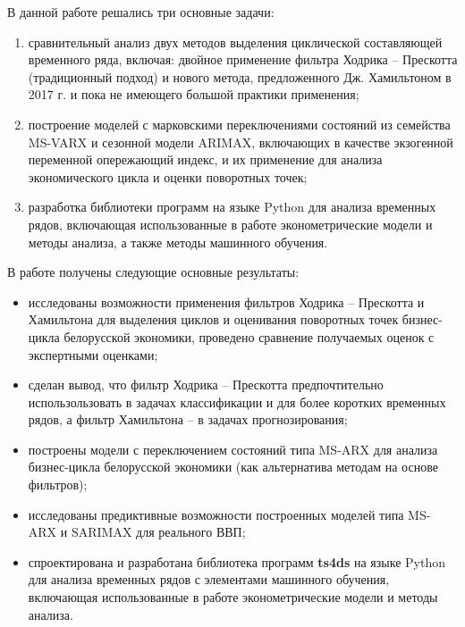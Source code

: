 \documentclass[a4paper,14pt]{extreport}
\begin{document}
{		В данной работе решались три основные задачи:
		\begin{enumerate}
			\item сравнительный анализ двух методов выделения циклической составляющей временного ряда, включая: двойное применение фильтра Ходрика -- Прескотта (традиционный подход) и нового метода, предложенного Дж. Хамильтоном в 2017 г. и пока не имеющего большой практики применения;
			
			\item построение моделей с марковскими переключениями состояний из семейства MS-VARX и сезонной модели ARIMAX, включающих в качестве экзогенной переменной опережающий индекс, и их применение для анализа экономического цикла и оценки поворотных точек;
			
			\item разработка библиотеки программ на языке Python для анализа временных рядов, включающая использованные в работе эконометрические модели и методы анализа, а также методы машинного обучения.
		\end{enumerate}
		\fi
		
		В работе получены следующие основные результаты:
		
		\begin{itemize}
			\item исследованы возможности применения фильтров Ходрика -- Прескотта и Хамильтона для выделения циклов и оценивания поворотных точек бизнес-цикла белорусской экономики, проведено сравнение получаемых оценок с экспертными оценками;
			
			\item сделан вывод, что фильтр Ходрика -- Прескотта предпочтительно использользовать в задачах классификации и для более коротких временных рядов, а фильтр Хамильтона -- в задачах прогнозирования;
			
			\item построены модели с переключением состояний типа MS-ARX для анализа бизнес-цикла белорусской экономики (как альтернатива методам на основе фильтров);
			
			\item исследованы предиктивные возможности построенных моделей типа MS-ARX и SARIMAX для реального ВВП;
			
			\item спроектирована и разработана библиотека программ \textbf{ts4ds} на языке Python для анализа временных рядов с элементами машинного обучения, включающая использованные в работе эконометрические модели и методы анализа.
		\end{itemize}
		
}
\end{document}
